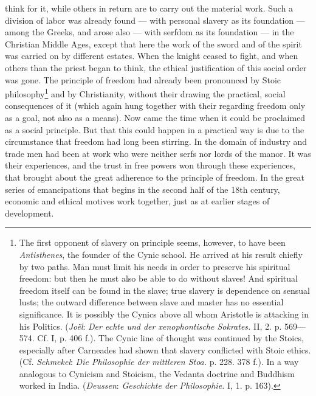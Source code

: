 \documentclass[12pt,a4paper,openany]{book}
\newcommand{\opage}[1]{\marginnote{\footnotesize\textit{[#1]}}}
\begin{document}
think for it, while others in return are to carry out the material work. Such a division of labor was already found ---
with personal slavery as its foundation --- among the Greeks, and arose also --- with serfdom as its foundation --- in the
Christian Middle Ages, except that here the work of the sword and of the spirit was carried on by different estates. When
the knight ceased to fight, and when others than the priest began to think, the ethical justification of this social
order was gone. The principle of freedom had already been pronounced by Stoic philosophy\footnote[1]{The first opponent
of slavery on principle seems, however, to have been \emph{Antisthenes}, the founder of the Cynic school. He arrived at his
result chiefly by two paths. Man must limit his needs in order to preserve his spiritual freedom: but then he must also
be able to do without slaves! And spiritual freedom itself can be found in the slave; true slavery is dependence on
sensual lusts; the outward difference between slave and master has no essential significance. It is possibly the Cynics
above all whom Aristotle is attacking in his Politics. (\emph{Joël}: \textit{Der echte und der xenophontische Sokrates.}
II, 2. p. 569---574. Cf. I, p. 406 f.). The Cynic line of thought was continued by the Stoics, especially after Carneades
had shown that slavery conflicted with Stoic ethics. (Cf. \emph{Schmekel}: \textit{Die Philosophie der mittleren Stoa.}
p. 228. 378 f.). In a way analogous to Cynicism and Stoicism, the Vedanta doctrine and Buddhism worked in India.
(\emph{Deussen}: \textit{Geschichte der Philosophie.} I, 1. p. 163).} and by Christianity, without their drawing the
practical, social consequences of it (which again hung together with their regarding freedom only as a goal, not also as
a means). Now came the time when it could be proclaimed as a social principle. But that this could happen in a practical
way is due to the circumstance that freedom
\opage{349}had long been stirring. In the domain of industry and trade men had been at work who were neither serfs nor
lords of the manor. It was their experiences, and the trust in free powers won through these experiences, that brought
about the great adherence to the principle of freedom. In the great series of emancipations that begins in the second
half of the 18th century, economic and ethical motives work together, just as at earlier stages of development.
\end{document}
